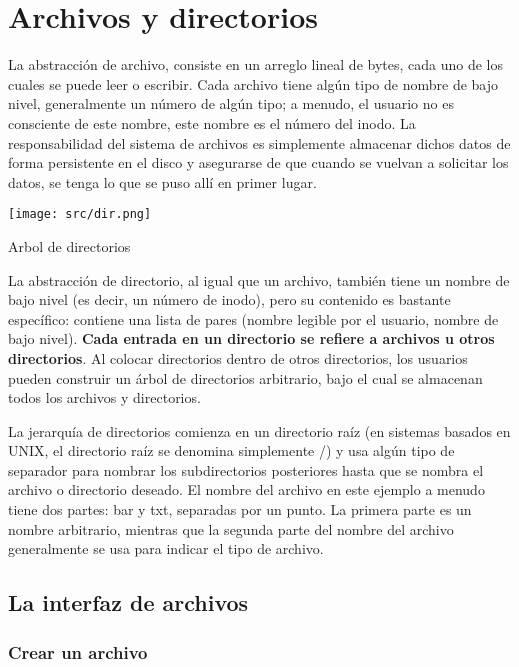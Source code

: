 \documentclass[openany]{book}
\begin{document}
\newpage
\section{Archivos y directorios}
La \colorbox{yellow!20}{abstracción de archivo}, consiste en un arreglo lineal de bytes, cada uno de los cuales se puede leer o escribir. Cada archivo tiene algún tipo de nombre de bajo nivel, generalmente un número de algún tipo; a menudo, el usuario no es consciente de este nombre, este nombre es el número del \colorbox{yellow!20}{inodo}. La responsabilidad del sistema de archivos es simplemente \colorbox{yellow!20}{almacenar} dichos datos de forma \colorbox{yellow!20}{persistente} en el disco y asegurarse de que cuando se vuelvan a solicitar los datos, se tenga lo que se puso allí en primer lugar.

\begin{floatingfigure}[r]{0.4\textwidth}
    \texttt{[image: src/dir.png]}
    \caption{Arbol de directorios}
\end{floatingfigure}

La \colorbox{yellow!20}{abstracción de directorio}, al igual que un archivo, también tiene un nombre de bajo nivel (es decir, un número de inodo), pero su contenido es bastante específico: contiene una lista de pares (\colorbox{yellow!20}{nombre legible} por el usuario, \colorbox{yellow!20}{nombre} de \colorbox{yellow!20}{bajo} \colorbox{yellow!20}{nivel}). \textbf{Cada entrada en un directorio se refiere a archivos u otros directorios}. Al colocar directorios dentro de otros directorios, los usuarios pueden construir un \colorbox{yellow!20}{árbol} de directorios arbitrario, bajo el cual se almacenan todos los archivos y directorios. 

La jerarquía de directorios comienza en un directorio raíz (en sistemas basados en UNIX, el directorio raíz se denomina simplemente /) y usa algún tipo de separador para nombrar los subdirectorios posteriores hasta que se nombra el archivo o directorio deseado. El nombre del archivo en este ejemplo a menudo tiene dos partes: bar y txt, separadas por un punto. La primera parte es un nombre arbitrario, mientras que la segunda parte del nombre del archivo generalmente se usa para indicar el tipo de archivo.

\subsection{La interfaz de archivos}

\subsubsection{Crear un archivo}
\end{document}

